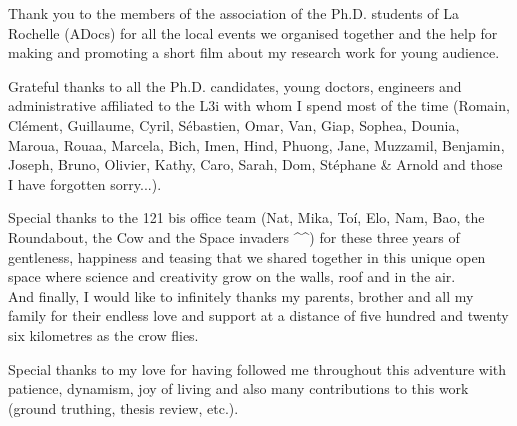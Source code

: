 Thank you to the members of the association of the Ph.D. students of La Rochelle (ADocs) for all the local events we organised together and the help for making and promoting a short film about my research work for young audience.

Grateful thanks to all the Ph.D. candidates, young doctors, engineers and administrative affiliated to the L3i with whom I spend most of the time (Romain, Clément, Guillaume, Cyril, Sébastien, Omar, Van, Giap, Sophea, Dounia, Maroua, Rouaa, Marcela, Bich, Imen, Hind, Phuong, Jane, Muzzamil, Benjamin, Joseph, Bruno, Olivier, Kathy, Caro, Sarah, Dom, Stéphane \& Arnold and those I have forgotten sorry...).

Special thanks to the 121 bis office team (Nat, Mika, To\'{i}, Elo, Nam, Bao, the Roundabout, the Cow and the Space invaders \^{ }\^{ }) for these three years of gentleness, happiness and teasing that we shared together in this unique open space where science and creativity grow on the walls, roof and in the air.
\\

And finally, I would like to infinitely thanks my parents, brother and all my family for their endless love and support at a distance of five hundred and twenty six kilometres as the crow flies.

Special thanks to my love for having followed me throughout this adventure with patience, dynamism, joy of living and also many contributions to this work (ground truthing, thesis review, etc.).





